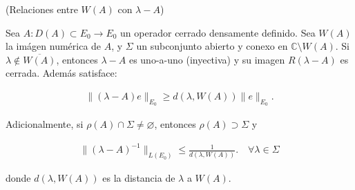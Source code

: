 \begin{Teorema}{(Relaciones entre $W(A)$ con $\lambda - A$)}
    \label{ch:semigrupos:th:ImgNumerica}

    Sea $A : D(A) \subset E_0 \rightarrow E_0$ un operador cerrado densamente definido. Sea $W(A)$ la imágen numérica de $A$, y $\Sigma$ un subconjunto abierto y conexo en $\mathbb{C} \setminus W(A)$. Si $\lambda \not \in \overline{W(A)}$, entonces $\lambda - A$ es uno-a-uno (inyectiva) y su imagen $R(\lambda - A)$ es cerrada. Además satisface:

    \begin{align}
        \label{ch:semigrupos:th:ImgNumerica:desIg1}
        \lVert (\lambda - A)e \rVert_{E_0} \geq d(\lambda, W(A)) \lVert e \rVert_{E_0}.
    \end{align}

    Adicionalmente, si $\rho(A) \cap \Sigma \neq \varnothing$, entonces $\rho(A) \supset \Sigma$ y

    \begin{align}
        \label{ch:semigrupos:th:ImgNumerica:desIg2}
        \lVert (\lambda - A)^{-1}\rVert_{L(E_0)} \leq \frac{1}{d(\lambda, W(A))}. \quad \forall \lambda \in \Sigma
    \end{align}

    donde $d(\lambda, W(A))$ es la distancia de $\lambda$ a $W(A)$.
\end{Teorema}

